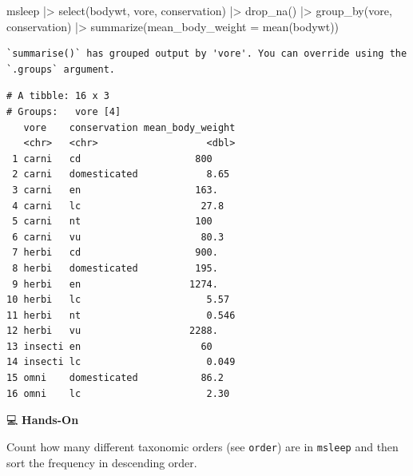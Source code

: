 \documentclass[
  letterpaper,
  DIV=11,
  numbers=noendperiod]{scrreprt}
\newenvironment{Shaded}{\begin{snugshade}}{\end{snugshade}}
\newcommand{\AttributeTok}[1]{\textcolor[rgb]{0.40,0.45,0.13}{#1}}
\newcommand{\FunctionTok}[1]{\textcolor[rgb]{0.28,0.35,0.67}{#1}}
\newcommand{\NormalTok}[1]{\textcolor[rgb]{0.00,0.23,0.31}{#1}}
\newcommand{\SpecialCharTok}[1]{\textcolor[rgb]{0.37,0.37,0.37}{#1}}
\begin{document}
\begin{tcolorbox}[enhanced jigsaw, colbacktitle=quarto-callout-tip-color!10!white, opacitybacktitle=0.6, breakable, left=2mm, leftrule=.75mm, toprule=.15mm, toptitle=1mm, bottomtitle=1mm, colframe=quarto-callout-tip-color-frame, opacityback=0, coltitle=black, arc=.35mm, titlerule=0mm, colback=white, bottomrule=.15mm, title=\textcolor{quarto-callout-tip-color}{\faLightbulb}\hspace{0.5em}{Answer}, rightrule=.15mm]

\begin{Shaded}
\begin{Highlighting}[]
\NormalTok{msleep }\SpecialCharTok{|\textgreater{}}
  \FunctionTok{select}\NormalTok{(bodywt, vore, conservation) }\SpecialCharTok{|\textgreater{}}
  \FunctionTok{drop\_na}\NormalTok{() }\SpecialCharTok{|\textgreater{}}
  \FunctionTok{group\_by}\NormalTok{(vore, conservation) }\SpecialCharTok{|\textgreater{}}
  \FunctionTok{summarize}\NormalTok{(}\AttributeTok{mean\_body\_weight =} \FunctionTok{mean}\NormalTok{(bodywt))}
\end{Highlighting}
\end{Shaded}

\begin{verbatim}
`summarise()` has grouped output by 'vore'. You can override using the
`.groups` argument.
\end{verbatim}

\begin{verbatim}
# A tibble: 16 x 3
# Groups:   vore [4]
   vore    conservation mean_body_weight
   <chr>   <chr>                   <dbl>
 1 carni   cd                    800    
 2 carni   domesticated            8.65 
 3 carni   en                    163.   
 4 carni   lc                     27.8  
 5 carni   nt                    100    
 6 carni   vu                     80.3  
 7 herbi   cd                    900.   
 8 herbi   domesticated          195.   
 9 herbi   en                   1274.   
10 herbi   lc                      5.57 
11 herbi   nt                      0.546
12 herbi   vu                   2288.   
13 insecti en                     60    
14 insecti lc                      0.049
15 omni    domesticated           86.2  
16 omni    lc                      2.30 
\end{verbatim}

\end{tcolorbox}

💻 \textbf{Hands-On}

Count how many different taxonomic orders (see \texttt{order}) are in
\texttt{msleep} and then sort the frequency in descending order.
\end{document}
